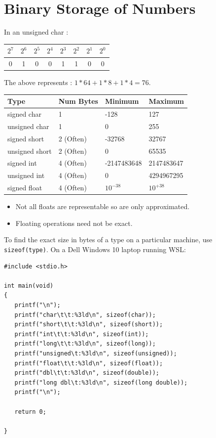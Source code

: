 \documentclass[a4,portraitt]{slides}
\begin{document}
\section*{Binary Storage of Numbers}

In an unsigned char :

\begin{center}
\begin{tabular}{|c|c|c|c|c|c|c|c|}\hline
$2^7$ & $2^6$ & $2^5$ & $2^4$ & $2^3$ & $2^2$ & $2^1$ & $2^0$ \\ \hline
0     & 1     & 0     & 0     & 1     & 1     & 0     & 0     \\ \hline
\end{tabular}
\end{center}

The above represents : $1 * 64 + 1 * 8 + 1 * 4 = 76$.

{\small
\begin{center}
\begin{tabular}{|l|l|l|l|} \hline
Type        & Num Bytes & Minimum   & Maximum   \\ \hline
signed char & 1     & -128      & 127       \\
unsigned char   & 1     & 0     & 255       \\
signed short    & 2 (Often) & -32768    & 32767 \\
unsigned short  & 2 (Often) & 0     & 65535 \\
signed int  & 4 (Often) & -2147483648   & 2147483647    \\
unsigned int    & 4 (Often) & 0     & 4294967295    \\
signed float    & 4 (Often) & $10^{-38}$    & $10^{+38}$    \\
\hline
\end{tabular}
\end{center}
}

\begin{itemize}
\item Not all floats are representable so are only approximated.
\item Floating operations need not be exact.
\end{itemize}

To find the exact size in bytes of a type on a particular machine,
use {\tt sizeof(type)}. On a Dell Windows 10 laptop running WSL:
{\small
\begin{verbatim}
#include <stdio.h>

int main(void)
{
   printf("\n");
   printf("char\t\t:%3ld\n", sizeof(char));
   printf("short\t\t:%3ld\n", sizeof(short));
   printf("int\t\t:%3ld\n", sizeof(int));
   printf("long\t\t:%3ld\n", sizeof(long));
   printf("unsigned\t:%3ld\n", sizeof(unsigned));
   printf("float\t\t:%3ld\n", sizeof(float));
   printf("dbl\t\t:%3ld\n", sizeof(double));
   printf("long dbl\t:%3ld\n", sizeof(long double));
   printf("\n");

   return 0;

}
\end{verbatim}
}
\end{document}

